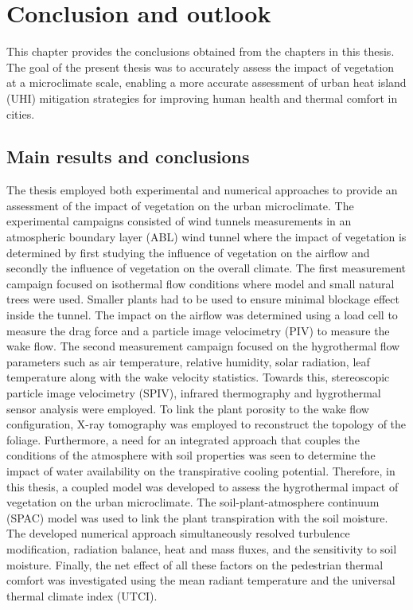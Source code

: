 \chapter{Conclusion and outlook}
\label{ch:conclusions}

This chapter provides the conclusions obtained from the chapters in this thesis. The goal of the present thesis was to accurately assess the impact of vegetation at a microclimate scale, enabling a more accurate assessment of urban heat island (UHI) mitigation strategies for improving human health and thermal comfort in cities.

\section{Main results and conclusions}

The thesis employed both experimental and numerical approaches to provide an assessment of the impact of vegetation on the urban microclimate. The experimental campaigns consisted of wind tunnels measurements in an atmospheric boundary layer (ABL) wind tunnel where the impact of vegetation is determined by first studying the influence of vegetation on the airflow and secondly the influence of vegetation on the overall climate. The first measurement campaign focused on isothermal flow conditions where model and small natural trees were used. Smaller plants had to be used to ensure minimal blockage effect inside the tunnel. The impact on the airflow was determined using a load cell to measure the drag force and a particle image velocimetry (PIV) to measure the wake flow. The second measurement campaign focused on the hygrothermal flow parameters such as air temperature, relative humidity, solar radiation, leaf temperature along with the wake velocity statistics. Towards this, stereoscopic particle image velocimetry (SPIV), infrared thermography and hygrothermal sensor analysis were employed. To link the plant porosity to the wake flow configuration, X-ray tomography was employed to reconstruct the topology of the foliage. Furthermore, a need for an integrated approach that couples the conditions of the atmosphere with soil properties was seen to determine the impact of water availability on the transpirative cooling potential. Therefore, in this thesis, a coupled model was developed to assess the hygrothermal impact of vegetation on the urban microclimate. The soil-plant-atmosphere continuum (SPAC) model was used to link the plant transpiration with the soil moisture. The developed numerical approach simultaneously resolved turbulence modification, radiation balance, heat and mass fluxes, and the sensitivity to soil moisture. Finally, the net effect of all these factors on the pedestrian thermal comfort was investigated using the mean radiant temperature and the universal thermal climate index (UTCI).

